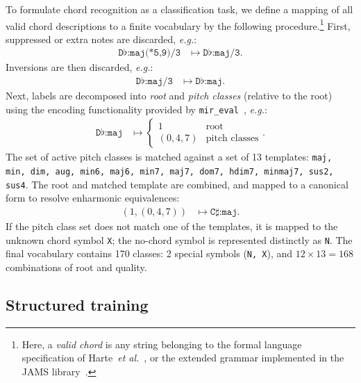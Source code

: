 \documentclass{article}
\def\eg{\emph{e.g.\/}}
\begin{document}
To formulate chord recognition as a classification task, we define a mapping of all valid chord descriptions to a finite vocabulary by the following procedure.\footnote{Here, a \emph{valid chord} is any string belonging to the formal language specification of Harte~\emph{et al.}~\cite{harte2005symbolic}, or the extended grammar implemented in the JAMS library~\cite{humphrey2014jams}.}
First, suppressed or extra notes are discarded, \eg:
\begin{align*}
    \texttt{D}\flat\texttt{:maj(*5,9)/3} &\mapsto \texttt{D}\flat\texttt{:maj/3}.
\end{align*}
Inversions are then discarded, \eg:
\begin{align*}
    \texttt{D}\flat\texttt{:maj/3} &\mapsto \texttt{D}\flat\texttt{:maj}.
\end{align*}
Next, labels are decomposed into \emph{root} and \emph{pitch classes} (relative to the root) using the encoding functionality provided by \texttt{mir\_eval}~\cite{raffel2014mir_eval}, \eg:
\begin{align*}
    \texttt{D}\flat\texttt{:maj} &\mapsto \begin{cases}
        1 & \text{root}\\
        (0, 4, 7) & \text{pitch classes}
    \end{cases}.
\end{align*}
The set of active pitch classes is matched against a set of 13 templates: \texttt{maj, min, dim, aug, min6, maj6, min7, maj7, dom7, hdim7, minmaj7, sus2, sus4}.
The root and matched template are combined, and mapped to a canonical form to resolve enharmonic equivalences:
\begin{align*}
    \left(1, (0, 4, 7) \right) &\mapsto \texttt{C}\sharp\texttt{:maj}.
\end{align*}
If the pitch class set does not match one of the templates, it is mapped to the unknown chord symbol \texttt{X}; the no-chord symbol is represented distinctly as \texttt{N}.
The final vocabulary contains 170 classes: 2 special symbols (\texttt{N, X}), and $12\times13=168$ combinations of root and quality.


\subsection{Structured training}


%       
\end{document}

